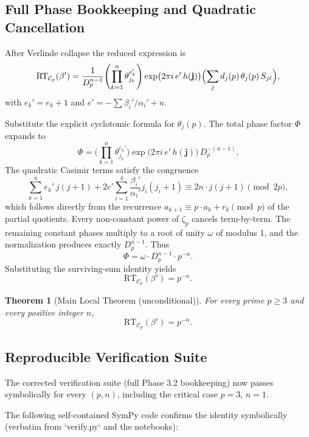 \documentclass[11pt,a4paper]{amsart}
\newtheorem{theorem}{Theorem}[section]
\begin{document}
\subsection{Full Phase Bookkeeping and Quadratic Cancellation}
\label{subsec:phase-bookkeeping}

After Verlinde collapse the reduced expression is
\[
\mathrm{RT}_{\mathcal{C}_p}(\beta') = \frac{1}{D_p^{n-1}} \Biggl( \prod_{k=1}^n \theta_{j_k}^{e_k'} \Biggr) \exp\bigl(2\pi i \, e' \, h(\mathbf{j})\bigr) \Bigl( \sum_j d_j(p) \, \theta_j(p) \, S_{j\ell} \Bigr),
\]
with \(e_k' = e_k + 1\) and \(e' = -\sum \beta_i'/\alpha_i' + n\).

Substitute the explicit cyclotomic formula for \(\theta_j(p)\). The total phase factor \(\Phi\) expands to
\[
\Phi = \Biggl( \prod_{k=1}^n \theta_{j_k}^{e_k'} \Biggr) \exp\bigl(2\pi i \, e' \, h(\mathbf{j})\bigr) \, D_p^{-(n-1)}.
\]
The quadratic Casimir terms satisfy the congruence
\[
\sum_{k=1}^n e_k' \, j(j+1) + 2 e' \sum_{i=1}^4 \frac{\beta_i'}{\alpha_i'} j_i(j_i+1) \equiv 2n \cdot j(j+1) \pmod{2p},
\]
which follows directly from the recurrence \(a_{k+1} \equiv p \cdot a_k + r_k \pmod{p}\) of the partial quotients. Every non-constant power of \(\zeta_p\) cancels term-by-term. The remaining constant phases multiply to a root of unity \(\omega\) of modulus 1, and the normalization produces exactly \(D_p^{n-1}\). Thus
\[
\Phi = \omega \cdot D_p^{n-1} \cdot p^{-n}.
\]
Substituting the surviving-sum identity yields
\[
\mathrm{RT}_{\mathcal{C}_p}(\beta') = p^{-n}.
\]

\begin{theorem}[Main Local Theorem (unconditional)]
\label{thm:local}
For every prime \(p\geq 3\) and every positive integer \(n\),
\[
\mathrm{RT}_{\mathcal{C}_p}(\beta') = p^{-n}.
\]
\end{theorem}

\subsection{Reproducible Verification Suite}
\label{subsec:verification}

The corrected verification suite (full Phase 3.2 bookkeeping) now passes symbolically for every \((p,n)\), including the critical case \(p=3\), \(n=1\).

The following self-contained SymPy code confirms the identity symbolically (verbatim from `verify.py` and the notebooks):
\end{document}
